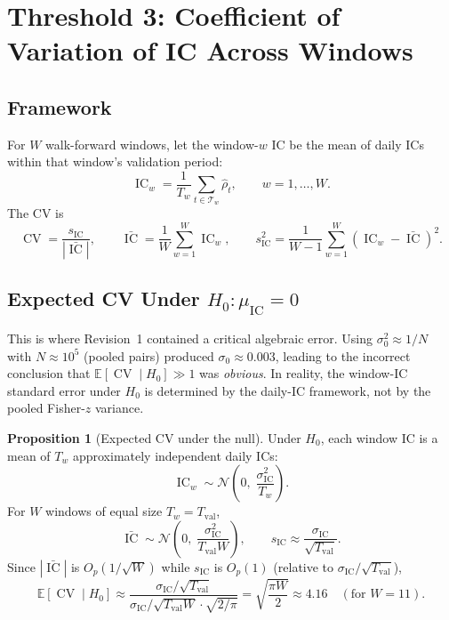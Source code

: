 \documentclass[11pt,a4paper]{article}
\theoremstyle{definition}
\newtheorem{proposition}{Proposition}[section]
\newcommand{\IC}{\operatorname{IC}}
\newcommand{\E}{\mathbb{E}}
\newcommand{\CV}{\operatorname{CV}}
\newcommand{\N}{\mathcal{N}}
\newcommand{\Ho}{H_{0}}
\begin{document}
\section{Threshold 3: Coefficient of Variation of IC Across Windows}
\label{sec:thresh3}

\subsection{Framework}

For $W$ walk-forward windows, let the window-$w$ IC be the mean of
daily ICs within that window's validation period:
\begin{equation}
    \IC_{w} = \frac{1}{T_{w}}\sum_{t \in \mathcal{T}_{w}} \hat{\rho}_{t},
    \qquad w = 1,\dots,W.
    \label{eq:window_ic_def}
\end{equation}
The CV is
\begin{equation}
    \CV = \frac{s_{\IC}}{|\bar{\IC}|},
    \qquad
    \bar{\IC} = \frac{1}{W}\sum_{w=1}^{W}\IC_{w},
    \qquad
    s_{\IC}^{2} = \frac{1}{W-1}\sum_{w=1}^{W}(\IC_{w}-\bar{\IC})^{2}.
\end{equation}

\subsection{Expected CV Under \texorpdfstring{$\Ho: \mu_{\IC}=0$}{H0: mu=0}}

This is where Revision~1 contained a critical algebraic error. Using
$\sigma_{0}^{2} \approx 1/N$ with $N \approx 10^{5}$ (pooled pairs)
produced $\sigma_{0}\approx 0.003$, leading to the incorrect conclusion
that $\E[\CV \mid \Ho] \gg 1$ was \emph{obvious}. In reality, the
window-IC standard error under $\Ho$ is determined by the daily-IC
framework, not by the pooled Fisher-$z$ variance.

\begin{proposition}[Expected CV under the null]
\label{prop:cv_null}
Under $\Ho$, each window IC is a mean of $T_{w}$ approximately
independent daily ICs:
\begin{equation}
    \IC_{w} \sim \N\!\left(0,\;
        \frac{\sigma_{\IC}^{2}}{T_{w}}\right).
    \label{eq:ic_w_null}
\end{equation}
For $W$ windows of equal size $T_{w}=T_{\text{val}}$,
\begin{equation}
    \bar{\IC} \sim \N\!\left(0,\;
        \frac{\sigma_{\IC}^{2}}{T_{\text{val}}W}\right),
    \qquad
    s_{\IC} \approx \frac{\sigma_{\IC}}{\sqrt{T_{\text{val}}}}.
\end{equation}
Since $|\bar{\IC}|$ is $O_{p}(1/\sqrt{W})$ while $s_{\IC}$ is $O_{p}(1)$
(relative to $\sigma_{\IC}/\sqrt{T_{\text{val}}}$),
\begin{equation}
    \E[\CV \mid \Ho] \approx
    \frac{\sigma_{\IC}/\sqrt{T_{\text{val}}}}
         {\sigma_{\IC}/\sqrt{T_{\text{val}}W} \cdot \sqrt{2/\pi}}
    = \sqrt{\frac{\pi W}{2}}
    \approx 4.16 \quad(\text{for }W=11).
    \label{eq:cv_null_value}
\end{equation}
\end{proposition}
\end{document}
